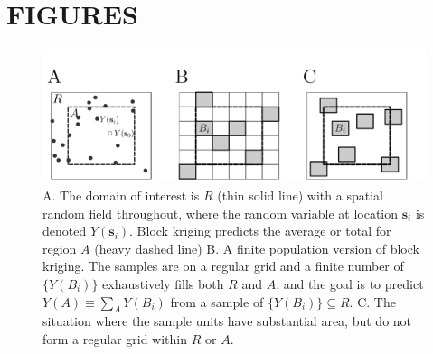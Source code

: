 \documentclass[12pt, titlepage]{article}\usepackage[]{graphicx}\usepackage[]{color}
\begin{document}
\clearpage


\section*{FIGURES}





	\begin{figure}[H]
	\begin{center}
	\includegraphics[width=450pt]{FigRegionsSamples.pdf}
	\end{center}
	\caption{A. The domain of interest is $R$ (thin solid line) with a spatial random field throughout, where the random variable at location $\mathbf{s}_i$ is denoted $Y(\mathbf{s}_i)$.  Block kriging predicts the average or total for region $A$ (heavy dashed line) B. A finite population version of block kriging. The samples are on a regular grid and a finite number of $\{Y(B_i)\}$
	exhaustively fills both $R$ and $A$, and the goal is to predict $Y(A) \equiv
	\sum_AY(B_i)$ from a sample of $\{Y(B_i)\}\subseteq R$.  C. The situation where
	the sample units have substantial area, but do not form a regular grid within
	$R$ or $A$.\label{FigRegionsSamples}}         
	\end{figure}

\end{document}

